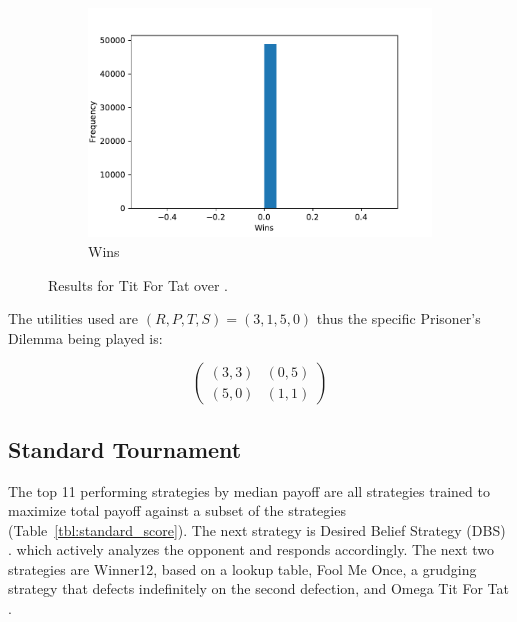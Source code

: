 \documentclass{article}
\begin{document}
\begin{figure}[!hbtp]
\begin{subfigure}[t]{.3\textwidth}
        \includegraphics[width=\textwidth]{./assets/standard_tft_wins.pdf}
        \caption{Wins}
        \label{fig:tit_for_tat_wins}
    \end{subfigure}%

    \caption{Results for Tit For Tat over
        \protecttournaments.}
\end{figure}

The utilities used are \((R, P, T, S)=(3, 1, 5, 0)\) thus the specific
Prisoner's Dilemma being played is:

\begin{equation}\label{equ:pd}
    \begin{pmatrix}
        (3, 3) & (0, 5)\\
        (5, 0) & (1, 1)
    \end{pmatrix}
\end{equation}

\subsection{Standard Tournament}\label{sec:standard}

The top 11 performing strategies by median payoff are all strategies trained to maximize
total payoff against a subset of the strategies (Table~\ref{tbl:standard_score}).
The next strategy is Desired Belief Strategy (DBS) \cite{Au2006}.
which actively analyzes the opponent and responds
accordingly. The next two strategies are Winner12, based on a lookup table,
Fool Me Once, a grudging strategy that defects indefinitely on
the second defection, and Omega Tit For Tat \cite{kendall2007iterated}.
\end{document}
